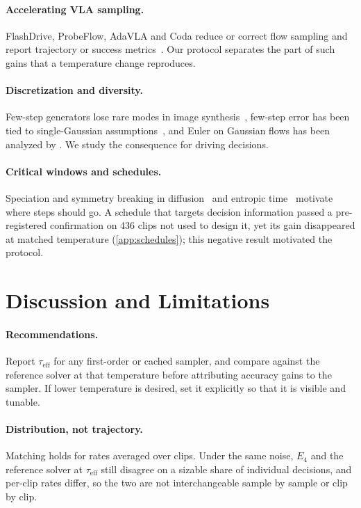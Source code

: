 \documentclass{article}
\theoremstyle{plain}
\theoremstyle{definition}
\theoremstyle{remark}
\newcommand{\taueff}{\tau_{\mathrm{eff}}}
\begin{document}
\paragraph{Accelerating VLA sampling.} FlashDrive, ProbeFlow, AdaVLA and Coda reduce or correct flow sampling and report trajectory or success metrics~\citep{flashdrive2026,probeflow2026,adavla2026,coda2026}. Our protocol separates the part of such gains that a temperature change reproduces.
\paragraph{Discretization and diversity.} Few-step generators lose rare modes in image synthesis~\citep{subflow2026}, few-step error has been tied to single-Gaussian assumptions~\citep{chen2025gmflow}, and Euler on Gaussian flows has been analyzed by \citet{claustre2026gaussian}. We study the consequence for driving decisions.
\paragraph{Critical windows and schedules.} Speciation and symmetry breaking in diffusion~\citep{biroli2024dynamical,raya2023ssb} and entropic time~\citep{stancevic2025entropic} motivate where steps should go. A schedule that targets decision information passed a pre-registered confirmation on 436 clips not used to design it, yet its gain disappeared at matched temperature (\cref{app:schedules}); this negative result motivated the protocol.

\section{Discussion and Limitations}
\label{sec:discussion}
\paragraph{Recommendations.} Report $\taueff$ for any first-order or cached sampler, and compare against the reference solver at that temperature before attributing accuracy gains to the sampler. If lower temperature is desired, set it explicitly so that it is visible and tunable.
\paragraph{Distribution, not trajectory.} Matching holds for rates averaged over clips. Under the same noise, $E_4$ and the reference solver at $\taueff$ still disagree on a sizable share of individual decisions, and per-clip rates differ, so the two are not interchangeable sample by sample or clip by clip.
\end{document}
